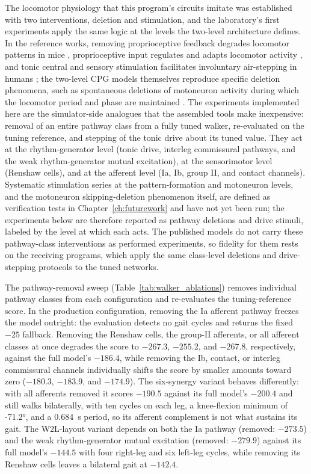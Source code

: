 The locomotor physiology that this program's circuits imitate was established with two interventions, deletion and stimulation, and the laboratory's first experiments apply the same logic at the levels the two-level architecture defines. In the reference works, removing proprioceptive feedback degrades locomotor patterns in mice \citep{akay_degradation_2014}, proprioceptive input regulates and adapts locomotor activity \citep{lam_role_2002}, and tonic central and sensory stimulation facilitates involuntary air-stepping in humans \citep{selionov_tonic_2009}; the two-level CPG models themselves reproduce specific deletion phenomena, such as spontaneous deletions of motoneuron activity during which the locomotor period and phase are maintained \citep{rybak_modelling_2006}. The experiments implemented here are the simulator-side analogues that the assembled tools make inexpensive: removal of an entire pathway class from a fully tuned walker, re-evaluated on the tuning reference, and stepping of the tonic drive about its tuned value. They act at the rhythm-generator level (tonic drive, interleg commissural pathways, and the weak rhythm-generator mutual excitation), at the sensorimotor level (Renshaw cells), and at the afferent level (Ia, Ib, group II, and contact channels). Systematic stimulation series at the pattern-formation and motoneuron levels, and the motoneuron skipping-deletion phenomenon itself, are defined as verification tests in Chapter~\ref{ch:futurework} and have not yet been run; the experiments below are therefore reported as pathway deletions and drive stimuli, labeled by the level at which each acts. The published models do not carry these pathway-class interventions as performed experiments, so fidelity for them rests on the receiving programs, which apply the same class-level deletions and drive-stepping protocols to the tuned networks.

The pathway-removal sweep (Table~\ref{tab:walker_ablations}) removes individual pathway classes from each configuration and re-evaluates the tuning-reference score. In the production configuration, removing the Ia afferent pathway freezes the model outright: the evaluation detects no gait cycles and returns the fixed $-25$ fallback. Removing the Renshaw cells, the group-II afferents, or all afferent classes at once degrades the score to $-267.3$, $-255.2$, and $-267.8$, respectively, against the full model's $-186.4$, while removing the Ib, contact, or interleg commissural channels individually shifts the score by smaller amounts toward zero ($-180.3$, $-183.9$, and $-174.9$). The six-synergy variant behaves differently: with all afferents removed it scores $-190.5$ against its full model's $-200.4$ and still walks bilaterally, with ten cycles on each leg, a knee-flexion minimum of \ang{-71.2}, and a \qty{0.684}{\second} period, so its afferent complement is not what sustains its gait. The W2L-layout variant depends on both the Ia pathway (removed: $-273.5$) and the weak rhythm-generator mutual excitation (removed: $-279.9$) against its full model's $-144.5$ with four right-leg and six left-leg cycles, while removing its Renshaw cells leaves a bilateral gait at $-142.4$.

